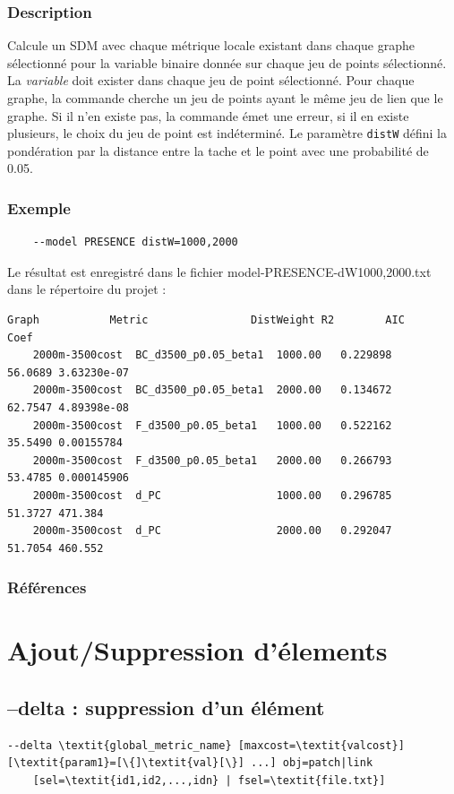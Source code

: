 \documentclass[a4paper,10pt]{report}
\begin{document}
\subsubsection{Description}
Calcule un SDM avec chaque métrique locale existant dans chaque graphe sélectionné pour la variable binaire donnée sur chaque jeu de points sélectionné.
La \textit{variable} doit exister dans chaque jeu de point sélectionné.
Pour chaque graphe, la commande cherche un jeu de points ayant le même jeu de lien que le graphe. Si il n'en existe pas, la commande émet une erreur, si il en existe plusieurs, le choix du jeu de point est indéterminé.
Le paramètre \verb|distW| défini la pondération par la distance entre la tache et le point avec une probabilité de 0.05.

\subsubsection{Exemple}
\begin{Verbatim}
	--model PRESENCE distW=1000,2000
\end{Verbatim}
Le résultat est enregistré dans le fichier model-PRESENCE-dW1000,2000.txt dans le répertoire du projet :
\begin{Verbatim}[tabsize=3]
	Graph           Metric                DistWeight R2        AIC       Coef
	2000m-3500cost  BC_d3500_p0.05_beta1  1000.00	0.229898	56.0689	3.63230e-07
	2000m-3500cost  BC_d3500_p0.05_beta1  2000.00	0.134672	62.7547	4.89398e-08
	2000m-3500cost  F_d3500_p0.05_beta1   1000.00	0.522162	35.5490	0.00155784
	2000m-3500cost  F_d3500_p0.05_beta1   2000.00	0.266793	53.4785	0.000145906
	2000m-3500cost  d_PC                  1000.00	0.296785	51.3727	471.384
	2000m-3500cost  d_PC                  2000.00	0.292047	51.7054	460.552
\end{Verbatim}

\subsubsection{Références}
\cite{2012_SDM, 2012_graphab_EMS, 2013_SDM, 2013_SDM_rainette}

\section{Ajout/Suppression d'élements}
\subsection{--delta : suppression d'un élément}
\begin{Verbatim}[commandchars=\\\{\}]
--delta \textit{global_metric_name} [maxcost=\textit{valcost}] [\textit{param1}=[\{]\textit{val}[\}] ...] obj=patch|link
	[sel=\textit{id1,id2,...,idn} | fsel=\textit{file.txt}]
\end{Verbatim}
\end{document}
